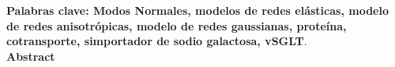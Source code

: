 \textbf{\small Palabras clave: Modos Normales, modelos de redes el\'{a}sticas, modelo de redes anisotr\'{o}picas, modelo de redes gaussianas, prote\'{i}na, cotransporte, simportador de sodio galactosa, vSGLT}.\\[2.0cm]
\newpage
\textbf{\LARGE Abstract}\\\\

